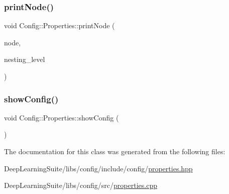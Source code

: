 \mbox{\label{class_config_1_1_properties_a04a44d109d5e9b34dd93b338e0754201}} 
\subsubsection{\texorpdfstring{print\+Node()}{printNode()}}
{\footnotesize\ttfamily void Config\+::\+Properties\+::print\+Node (\begin{DoxyParamCaption}\item[{Y\+A\+M\+L\+::\+Node}]{node,  }\item[{int}]{nesting\+\_\+level }\end{DoxyParamCaption})}

\mbox{\label{class_config_1_1_properties_a4c09553d96770e465f62a9899c94120d}} 
\subsubsection{\texorpdfstring{show\+Config()}{showConfig()}}
{\footnotesize\ttfamily void Config\+::\+Properties\+::show\+Config (\begin{DoxyParamCaption}{ }\end{DoxyParamCaption})}



The documentation for this class was generated from the following files\+:\begin{DoxyCompactItemize}
\item 
Deep\+Learning\+Suite/libs/config/include/config/\hyperlink{properties_8hpp}{properties.\+hpp}\item 
Deep\+Learning\+Suite/libs/config/src/\hyperlink{properties_8cpp}{properties.\+cpp}\end{DoxyCompactItemize}
